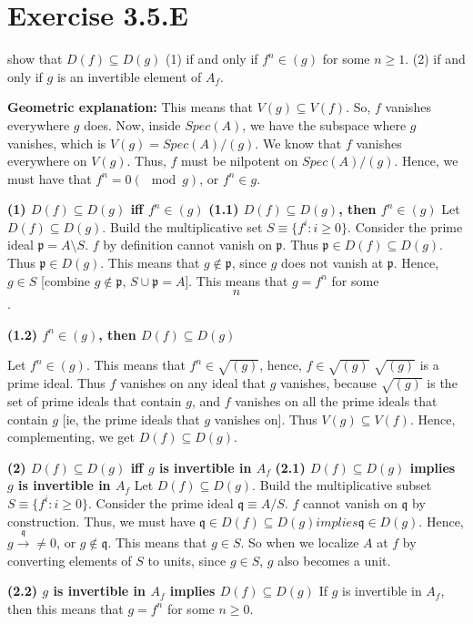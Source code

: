 \documentclass{book}
\newcommand{\p}{\mathfrak{p}}
\newcommand{\q}{\mathfrak{q}}
\newcommand{\rad}{\sqrt} %
\theoremstyle{definition}
\begin{document}
\section{Exercise 3.5.E}
show that  $D(f) \subseteq D(g)$ (1) if and only if $f^n \in (g)$
for some $n \geq  1$. (2) if and only if $g$ is an invertible element
of $A_f$. 

\textbf{Geometric explanation:}
This means that $V(g) \subseteq V(f)$. So, $f$ vanishes everywhere $g$
does. Now, inside $Spec(A)$, we have the subspace where $g$ vanishes,
which is $V(g) = Spec(A)/(g)$. We know that $f$ vanishes everywhere on $V(g)$.
Thus, $f$ must be nilpotent on $Spec(A)/(g)$. Hence, we must have that 
$f^n = 0 (\mod g)$, or $f^n \in g$.

\textbf{(1) $D(f) \subseteq D(g)$ iff $f^n \in (g)$}
\textbf{(1.1) $D(f) \subseteq D(g)$, then $f^n \in (g)$}
Let $D(f) \subseteq D(g)$.
Build the multiplicative set $S \equiv \{ f^i : i \geq 0\}$.
Consider the prime ideal $\p = A \setminus S $.
$f$ by definition cannot vanish on $\p$.
Thus $\p \in D(f) \subseteq D(g)$.
Thus $\p \in D(g)$.
This means that $g \not \in \p$, since $g$ does not vanish at
$\mathfrak p$.
Hence, $g \in S$ [combine $g \not \in \p$, $S \cup \p = A$].
This means that $g = f^n$ for some $$n$$.

\textbf{(1.2) $f^n \in (g)$, then $D(f) \subseteq D(g)$}

Let $f^n \in (g)$. This means that $f^n \in \rad{(g)}$, hence, $f \in \rad{(g)}$
$\rad{(g)}$ is a prime ideal. Thus $f$ vanishes on any ideal that $g$
vanishes, because $\rad{(g)}$ is the set of prime ideals that contain $g$,
and $f$ vanishes on all the prime ideals that contain $g$ [ie, the prime ideals that $g$
vanishes on]. Thus $V(g) \subseteq V(f)$. Hence, complementing,
we get $D(f) \subseteq D(g)$.

\textbf{(2) $D(f) \subseteq D(g)$ iff $g$ is invertible in $A_f$}
\textbf{(2.1) $D(f) \subseteq D(g)$ implies $g$ is invertible in $A_f$}
Let $D(f) \subseteq D(g)$. Build the multiplicative subset $S \equiv \{ f^i: i \geq 0 \}$.
Consider the prime ideal $\q \equiv A/S$. $f$ cannot vanish on $\q$ by 
construction. Thus, we must have $\q \in D(f) \subseteq D(g) implies \q \in D(g)$.
Hence, $g \xrightarrow{\q} \neq 0$, or $g \not \in \q$. This means that
$g \in S$. So when we localize $A$ at $f$ by converting elements of $S$
to units, since $g \in S$, $g$ also becomes a unit.

\textbf{(2.2) $g$ is invertible in $A_f$ implies $D(f) \subseteq D(g)$}
If $g$ is invertible in $A_f$, then this means that $g = f^n$ for some
$n \geq 0$. 
\end{document}
